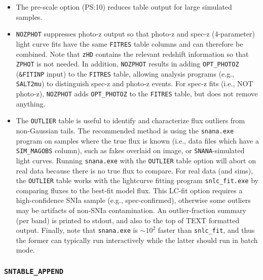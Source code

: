 \documentclass[12pt]{article}
\newcommand{\SNANA}{{\tt SNANA}}
\begin{document}
{\begin{itemize}
(flux vs. wavelength).
The {\tt MODELSPEC} table may be useful for calibration 
corrections that require an SED. To save storage, each spectrum 
is stored within the wavelength range defined by the passband.
%
\item
The pre-scale option (PS:10) reduces table output for large
simulated samples.
%
\item
{\tt NOZPHOT} suppresses photo-z output so that photo-z and spec-z 
(4-parameter) light curve fits have the same {\tt FITRES} table columns 
and can therefore be combined. Note that {\tt zHD} contains the 
relevant redshift information so that {\tt ZPHOT} is not needed. 
In addition, {\tt NOZPHOT} results in adding {\tt OPT\_PHOTOZ} 
({\tt \&FITINP} input) to the {\tt FITRES} table,
allowing analysis programs (e.g., {\tt SALT2mu})
to distinguish spec-z and photo-z events.
For spec-z fits (i.e., NOT photo-z),  
{\tt NOZPHOT} adds {\tt OPT\_PHOTOZ} to the {\tt FITRES} table,
but does not remove anything.
%
\item The {\tt OUTLIER} table is useful to identify and characterize
flux outliers from non-Gaussian tails. The recommended method is using
the {\tt snana.exe} program on samples where the true flux is known
(i.e., data files which have a {\tt SIM\_MAGOBS} column), 
such as fakes overlaid on image, or {\SNANA}-simulated light curves. 
Running {\tt snana.exe} with the {\tt OUTLIER} table option will 
abort on real data because there is no true flux to compare.
For real data (and sims), the {\tt OUTLIER} table works with the
lightcurve fitting program {\tt snlc\_fit.exe} by comparing fluxes to 
the best-fit model flux. This LC-fit option requires a high-confidence 
SNIa sample (e.g., spec-confirmed),
otherwise some outliers may be artifacts of non-SNIa contamination.
An outlier-fraction summary (per band) is printed to stdout,
and also to the top of TEXT formatted output.
Finally, note that {\tt snana.exe} is $\sim 10^2$ faster than {\tt snlc\_fit},
and thus the former can typically run interactively while the latter
should run in batch mode.
\end{itemize}

  \subsubsection{{\tt SNTABLE\_APPEND} }
  \label{sss:sntable_append}

}
\end{document}
